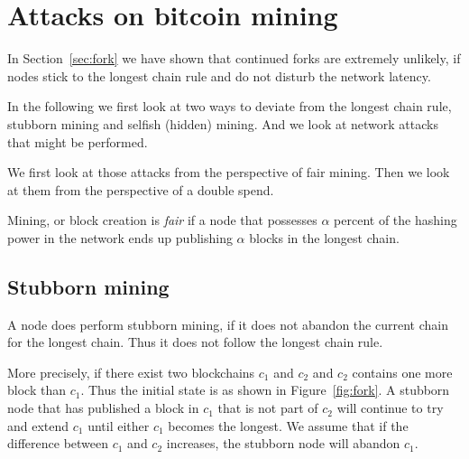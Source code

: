 
\section{Attacks on bitcoin mining}
In Section~\ref{sec:fork} we have shown that continued forks are
extremely unlikely, if nodes stick to the longest chain rule and
do not disturb the network latency.

In the following we first look at two ways to deviate from the 
longest chain rule, stubborn mining and selfish (hidden) mining.
And we look at network attacks that might be performed.

We first look at those attacks from the perspective of fair mining.
Then we look at them from the perspective of a double spend.

\begin{definition}
Mining, or block creation is \emph{fair} if a node that possesses $\alpha$ 
percent of the hashing power in the network ends up publishing $\alpha$
blocks in the longest chain.
\end{definition}


\subsection{Stubborn mining}
A node does perform stubborn mining, if it does not abandon the 
current chain for the longest chain. Thus it does not follow the longest chain rule.

More precisely, if there exist two blockchains $c_1$ and $c_2$ 
and $c_2$ contains one more block than $c_1$. Thus the initial state is as shown in Figure~\ref{fig:fork}.
A stubborn node that has published a block in $c_1$ that is not
part of $c_2$ will continue to try and extend $c_1$ until either
$c_1$ becomes the longest. We assume that if the difference between
$c_1$ and $c_2$ increases, the stubborn node will abandon $c_1$.

